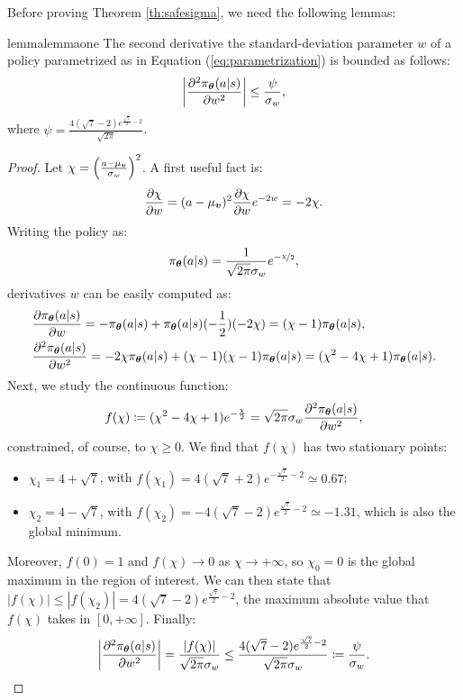Before proving Theorem \ref{th:safesigma}, we need the following lemmas:
\begin{restatable}[]{lemma}{lemmaone}\label{lem:1}
The second derivative \wrt the standard-deviation parameter $w$ of a policy parametrized as in Equation (\ref{eq:parametrization}) is bounded as follows:
\[
	\left|\frac{\partial^2\pi_{{\boldsymbol{\theta}}}(a\vert s)}{\partial w^2}\right|
	\leq \frac{\psi}{\sigma_w},
\]
where $\psi = \frac{4(\sqrt{7} - 2)e^{\frac{\sqrt{7}}{2} - 2}}{\sqrt{2\pi}}$.
\end{restatable}
\begin{proof}
Let $\chi = \left(\frac{a - \mu_{\boldsymbol{v}}}{\sigma_w}\right)^2$. 
A first useful fact is: 
\begin{align}\label{eq:a_1_1}
	\frac{\partial\chi}{\partial w} = (a-\mu_{\boldsymbol{v}})^2 \frac{\partial\chi}{\partial w}e^{-2w} = -2\chi.
\end{align}
Writing the policy as:
\[
\pi_{{\boldsymbol{\theta}}}(a \vert s) = \frac{1}{\sqrt{2\pi}\sigma_w}e^{-\nicefrac{\chi}{2}},
\]
derivatives \wrt $w$ can be easily computed as:
\begin{align}
&\frac{\partial \pi_{{\boldsymbol{\theta}}}(a \vert s)}{\partial w} = -\pi_{{\boldsymbol{\theta}}}(a \vert s) + \pi_{{\boldsymbol{\theta}}}(a \vert s)(-\frac{1}{2})(-2\chi) = (\chi-1)\pi_{{\boldsymbol{\theta}}}(a \vert s),\\
&\frac{\partial^2 \pi_{{\boldsymbol{\theta}}}(a \vert s)}{\partial w^2} = -2\chi\pi_{{\boldsymbol{\theta}}}(a \vert s) + (\chi-1)(\chi-1)\pi_{{\boldsymbol{\theta}}}(a \vert s) = (\chi^2-4\chi+1)\pi_{{\boldsymbol{\theta}}}(a \vert s). 
\end{align}
Next, we study the continuous function:
\[
	f(\chi) \coloneqq (\chi^2-4\chi+1)e^{-\frac{\chi}{2}} = \sqrt{2\pi}\sigma_w\frac{\partial^2 \pi_{{\boldsymbol{\theta}}}(a \vert s)}{\partial w^2},
\]
constrained, of course, to $\chi\geq0$. We find that $f(\chi)$ has two stationary points:
\begin{itemize}
	\item  $\chi_1 = 4+\sqrt{7}$, with $f(\chi_1) = 4(\sqrt{7}+2)e^{-\frac{\sqrt{7}}{2}-2}\simeq 0.67$;
	\item $\chi_2 = 4-\sqrt{7}$, with $f(\chi_2) = -4(\sqrt{7}-2)e^{\frac{\sqrt{7}}{2}-2}\simeq -1.31$, which is also the global minimum.
\end{itemize}
Moreover, $f(0) = 1$ and $f(\chi)\to 0$ as $\chi\to+\infty$, so $\chi_0 = 0$ is the global maximum in the region of interest.
We can then state that $|f(\chi)|\leq |f(\chi_2)| = 4(\sqrt{7}-2)e^{\frac{\sqrt{7}}{2}-2}$, the maximum absolute value that $f(\chi)$ takes in $[0,+\infty]$. Finally:
\[
	\left|\frac{\partial^2 \pi_{{\boldsymbol{\theta}}}(a \vert s)}{\partial w^2}\right| = \frac{|f(\chi)|}{\sqrt{2\pi}\sigma_w}
	\leq \frac{4(\sqrt{7}-2)e^{\frac{\sqrt{7}}{2}-2}}{\sqrt{2\pi}\sigma_w} \coloneqq \frac{\psi}{\sigma_w}.
\]
\end{proof}

